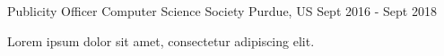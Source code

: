 

\begin{cventries}

  \cventry
    {Publicity Officer} %
    {Computer Science Society} %
    {Purdue, US} %
    {Sept 2016 - Sept 2018} %
    {
      \begin{cvitems} %
        \item {Lorem ipsum dolor sit amet, consectetur adipiscing elit.}
      \end{cvitems}
    }
\end{cventries}
